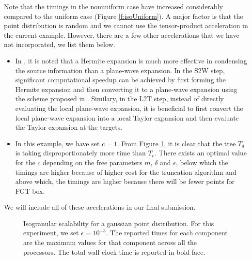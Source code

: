 Note that the timings in the nonuniform case have increased considerably compared to the uniform case (Figure \ref{f:isoUniform}). A major factor is that the point distribution is random and we cannot use the tensor-product acceleration in the current example. However, there are a few other accelerations that we have not incorporated, we list them below.
%
\begin{itemize}
  \item In \cite{fggt}, it is noted that a Hermite expansion is much more effective in condensing the source information than a plane-wave expansion. In the S2W step, significant computational speedup can be achieved by first forming the Hermite expansion and then converting it to a plane-wave expansion using the scheme proposed in \cite{fggt}. Similary, in the L2T step, instead of directly evaluating the local plane-wave expansion, it is beneficial to first convert the local plane-wave expansion into a local Taylor expansion and then evaluate the Taylor expansion at the targets. 
  \item In this example, we have set $c = 1$. From Figure \ref{f:isoGaussian}, it is clear that the tree $T_d$ is taking disproportionately more time than $T_e$. There exists an optimal value for the $c$ depending on the free parameters $m$, $\delta$ and $\epsilon$, below which the timings are higher because of higher cost for the truncation algorithm and above which, the timings are higher because there will be fewer points for FGT box.
\end{itemize}
%
We will include all of these accelerations in our final submission. 

\begin{figure}
	\begin{center}
	
	\end{center}
\caption{\label{f:isoGaussian} Isogranular scalability for a gaussian point distribution. For
 this experiment, we set $\epsilon = 10^{-3}$. The reported times for each component are the
 maximum values for that component across all the processors. The total wall-clock
time is reported in bold face.} 
\end{figure}

